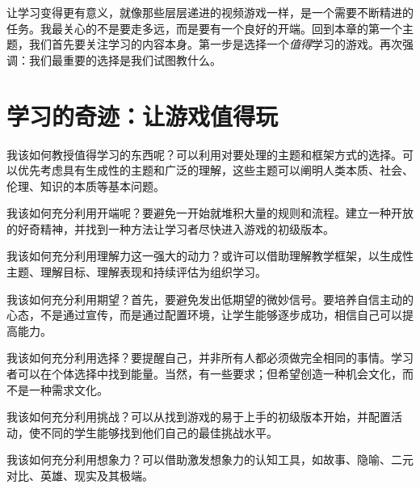 让学习变得更有意义，就像那些层层递进的视频游戏一样，是一个需要不断精进的任务。我最关心的不是要走多远，而是要有一个良好的开端。回到本章的第一个主题，我们首先要关注学习的内容本身。第一步是选择一个\textit{值得}学习的游戏。再次强调：我们最重要的选择是我们试图教什么。

\section*{学习的奇迹：让游戏值得玩}

我该如何教授值得学习的东西呢？可以利用对要处理的主题和框架方式的选择。可以优先考虑具有生成性的主题和广泛的理解，这些主题可以阐明人类本质、社会、伦理、知识的本质等基本问题。

我该如何充分利用开端呢？要避免一开始就堆积大量的规则和流程。建立一种开放的好奇精神，并找到一种方法让学习者尽快进入游戏的初级版本。

我该如何充分利用理解力这一强大的动力？或许可以借助理解教学框架，以生成性主题、理解目标、理解表现和持续评估为组织学习。

我该如何充分利用期望？首先，要避免发出低期望的微妙信号。要培养自信主动的心态，不是通过宣传，而是通过配置环境，让学生能够逐步成功，相信自己可以提高能力。

我该如何充分利用选择？要提醒自己，并非所有人都必须做完全相同的事情。学习者可以在个体选择中找到能量。当然，有一些要求；但希望创造一种机会文化，而不是一种需求文化。

我该如何充分利用挑战？可以从找到游戏的易于上手的初级版本开始，并配置活动，使不同的学生能够找到他们自己的最佳挑战水平。

我该如何充分利用想象力？可以借助激发想象力的认知工具，如故事、隐喻、二元对比、英雄、现实及其极端。

